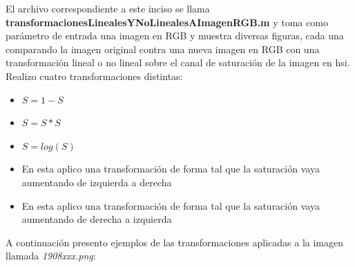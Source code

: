 \documentclass{article}
\begin{document}
El archivo correspondiente a este inciso se llama \textbf{transformacionesLinealesYNoLinealesAImagenRGB.m} y toma como parámetro de entrada una imagen en RGB y muestra diversas figuras, cada una comparando la imagen original contra una nueva imagen en RGB con una transformación lineal o no lineal sobre el canal de saturación de la imagen en hsi. Realizo cuatro transformaciones distintas:
\begin{itemize}
\item $S = 1 - S$
\item $S = S * S$
\item $S = log(S)$
\item En esta aplico una transformación de forma tal que la saturación vaya aumentando de izquierda a derecha
\item En esta aplico una transformación de forma tal que la saturación vaya aumentando de derecha a izquierda
\end{itemize}

A continuación presento ejemplos de las transformaciones aplicadas a la imagen llamada \textit{1908xxx.png}:
\end{document}
